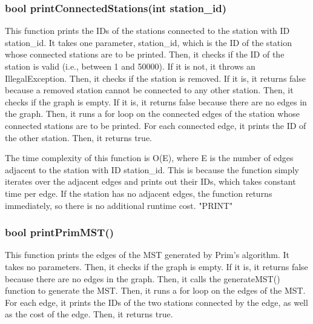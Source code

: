 		\subsubsection{{\color{orange}bool} {\color{draculapurple}printConnectedStations}({\color{draculapurple}int} station\_id)}
			
			This function prints the IDs of the stations connected to the station with ID {\color{draculapurple}station\_id}. It takes one parameter, {\color{draculapurple}station\_id}, which is the ID of the station whose connected stations are to be printed.
			Then, it checks if the ID of the station is valid (i.e., between 1 and 50000). If it is not, it throws an {\color{draculapurple}IllegalException}.
			Then, it checks if the station is removed. If it is, it returns {\color{draculapurple}false} because a removed station cannot be connected to any other station.
			Then, it checks if the graph is empty. If it is, it returns {\color{draculapurple}false} because there are no edges in the graph.
			Then, it runs a for loop on the connected edges of the station whose connected stations are to be printed. For each connected edge, it prints the ID of the other station.
			Then, it returns {\color{draculapurple}true}.

			The time complexity of this function is {\color{lightblue}O(E)}, where {\color{draculapurple}E} is the number of edges adjacent to the station with ID {\color{draculapurple}station\_id}. This is because the function simply iterates over the adjacent edges and prints out their IDs, which takes constant time per edge. If the station has no adjacent edges, the function returns immediately, so there is no additional runtime cost.
			{\color{GoldenYellow}"PRINT"}

		
			
		\subsubsection{{\color{orange}bool} {\color{draculapurple}printPrimMST}()}
			
			This function prints the edges of the MST generated by Prim's algorithm. It takes no parameters.
			Then, it checks if the graph is empty. If it is, it returns {\color{draculapurple}false} because there are no edges in the graph.
			Then, it calls the {\color{draculapurple}generateMST()} function to generate the MST. Then, it runs a for loop on the edges of the MST. For each edge, it prints the IDs of the two stations connected by the edge, as well as the cost of the edge.
			Then, it returns {\color{draculapurple}true}.

